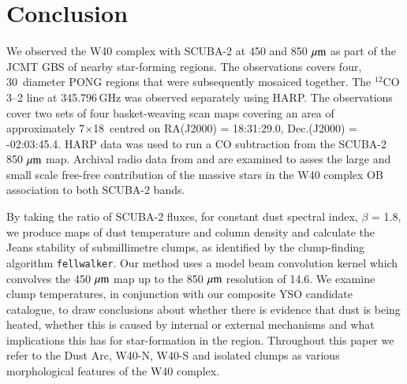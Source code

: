 


\section{Conclusion}

We observed the W40 complex with SCUBA-2 at 450 and 850\,$\,\mu\rm{m}$ as part of the JCMT 
GBS of nearby star-forming regions. The observations covers four, 30\arcmin\ diameter PONG 
regions that were subsequently mosaiced together. The $^{12}$CO 3\hbox{--}2 line at 
345.796\,GHz was observed separately using HARP. The observations cover two sets of four 
basket-weaving scan maps covering an area of approximately 7\arcmin$\times$18\arcmin\ 
centred on RA(J2000) = 18:31:29.0, Dec.(J2000) = -02:03:45.4. HARP data was used to run 
a CO subtraction from the SCUBA-2 850\,$\,\mu\rm{m}$ map. Archival radio data from \cite{Condon:1998kx} 
and \cite{Rodriguez:2010bs} are examined to asses the large and small scale free-free 
contribution of the massive stars in the W40 complex OB association to both SCUBA-2 bands.

By taking the ratio of SCUBA-2 fluxes, for constant dust spectral index, $\beta$ = 1.8, we produce 
maps of dust temperature and column density and calculate the Jeans stability of submillimetre 
clumps, as identified by the clump-finding algorithm \texttt{fellwalker}. Our method uses a model 
beam convolution kernel which convolves the 450\,$\,\mu\rm{m}$ map up to the 850\,$\,\mu\rm{m}$ 
resolution of 14.6\arcsec. We examine clump temperatures, in conjunction with our 
composite YSO candidate catalogue, to draw conclusions about whether there is evidence 
that dust is being heated, whether this is caused by internal or external mechanisms and what 
implications this has for star-formation in the region. Throughout this paper we refer to the Dust 
Arc, W40-N, W40-S and isolated clumps as various morphological features of the W40 complex.

